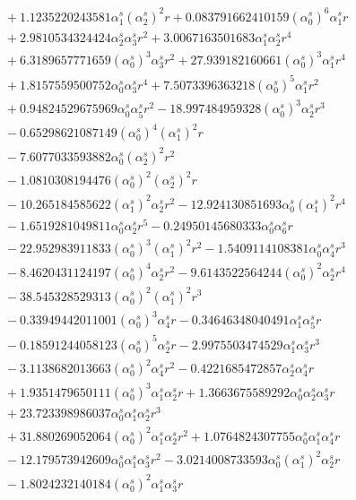 \documentclass[10pt]{article}
\begin{document}
\begin{align*}
&{}  + 1.1235220243581 \alpha_{1}^s \left(\alpha_{2}^s\right)^{2} r + 0.083791662410159 \left(\alpha_{0}^s\right)^{6} \alpha_{1}^s r \\
&{}  + 2.9810534324424 \alpha_{2}^s \alpha_{3}^s r^{2} + 3.0067163501683 \alpha_{1}^s \alpha_{2}^s r^{4} \\
&{}  + 6.3189657771659 \left(\alpha_{0}^s\right)^{3} \alpha_{3}^s r^{2} + 27.939182160661 \left(\alpha_{0}^s\right)^{3} \alpha_{1}^s r^{4} \\
&{}  + 1.8157559500752 \alpha_{0}^s \alpha_{3}^s r^{4} + 7.5073396363218 \left(\alpha_{0}^s\right)^{5} \alpha_{1}^s r^{2} \\
&{}  + 0.94824529675969 \alpha_{0}^s \alpha_{5}^s r^{2} - 18.997484959328 \left(\alpha_{0}^s\right)^{3} \alpha_{2}^s r^{3} \\
&{}  - 0.65298621087149 \left(\alpha_{0}^s\right)^{4} \left(\alpha_{1}^s\right)^{2} r \\
&{}  - 7.6077033593882 \alpha_{0}^s \left(\alpha_{2}^s\right)^{2} r^{2} \\
&{}  - 1.0810308194476 \left(\alpha_{0}^s\right)^{2} \left(\alpha_{2}^s\right)^{2} r \\
&{}  - 10.265184585622 \left(\alpha_{1}^s\right)^{2} \alpha_{2}^s r^{2} - 12.924130851693 \alpha_{0}^s \left(\alpha_{1}^s\right)^{2} r^{4} \\
&{}  - 1.6519281049811 \alpha_{0}^s \alpha_{2}^s r^{5} - 0.24950145680333 \alpha_{0}^s \alpha_{6}^s r \\
&{}  - 22.952983911833 \left(\alpha_{0}^s\right)^{3} \left(\alpha_{1}^s\right)^{2} r^{2} - 1.5409114108381 \alpha_{0}^s \alpha_{4}^s r^{3} \\
&{}  - 8.4620431124197 \left(\alpha_{0}^s\right)^{4} \alpha_{2}^s r^{2} - 9.6143522564244 \left(\alpha_{0}^s\right)^{2} \alpha_{2}^s r^{4} \\
&{}  - 38.545328529313 \left(\alpha_{0}^s\right)^{2} \left(\alpha_{1}^s\right)^{2} r^{3} \\
&{}  - 0.33949442011001 \left(\alpha_{0}^s\right)^{3} \alpha_{4}^s r - 0.34646348040491 \alpha_{1}^s \alpha_{5}^s r \\
&{}  - 0.18591244058123 \left(\alpha_{0}^s\right)^{5} \alpha_{2}^s r - 2.9975503474529 \alpha_{1}^s \alpha_{3}^s r^{3} \\
&{}  - 3.1138682013663 \left(\alpha_{0}^s\right)^{2} \alpha_{4}^s r^{2} - 0.4221685472857 \alpha_{2}^s \alpha_{4}^s r \\
&{}  + 1.9351479650111 \left(\alpha_{0}^s\right)^{3} \alpha_{1}^s \alpha_{2}^s r + 1.3663675589292 \alpha_{0}^s \alpha_{2}^s \alpha_{3}^s r \\
&{}  + 23.723398986037 \alpha_{0}^s \alpha_{1}^s \alpha_{2}^s r^{3} \\
&{}  + 31.880269052064 \left(\alpha_{0}^s\right)^{2} \alpha_{1}^s \alpha_{2}^s r^{2} + 1.0764824307755 \alpha_{0}^s \alpha_{1}^s \alpha_{4}^s r \\
&{}  - 12.179573942609 \alpha_{0}^s \alpha_{1}^s \alpha_{3}^s r^{2} - 3.0214008733593 \alpha_{0}^s \left(\alpha_{1}^s\right)^{2} \alpha_{2}^s r \\
&{}  - 1.8024232140184 \left(\alpha_{0}^s\right)^{2} \alpha_{1}^s \alpha_{3}^s r
\end{align*}
\end{document}
